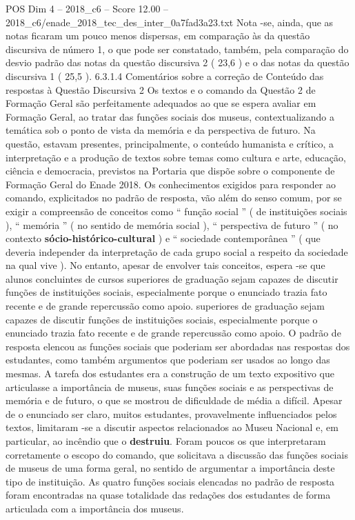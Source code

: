 \begin{textsample}{POS Dim 4 – 2018\_c6 – Score 12.00 – 2018\_c6/enade\_2018\_tec\_des\_inter\_0a7fad3a23.txt}
Nota -se, ainda, que as notas ficaram um pouco menos dispersas, em comparação às da questão discursiva de número 1, o que pode ser constatado, também, pela comparação do desvio padrão das notas da questão discursiva 2 ( 23,6 ) e o das notas da questão discursiva 1 ( 25,5 ). 6.3.1.4 Comentários sobre a correção de Conteúdo das respostas à Questão Discursiva 2 Os textos e o comando da Questão 2 de Formação Geral são perfeitamente adequados ao que se espera avaliar em Formação Geral, ao tratar das funções sociais dos museus, contextualizando a temática sob o ponto de vista da memória e da perspectiva de futuro.
Na questão, estavam presentes, principalmente, o conteúdo humanista e crítico, a interpretação e a produção de textos sobre temas como cultura e arte, educação, ciência e democracia, previstos na Portaria que dispõe sobre o componente de Formação Geral do Enade 2018.
Os conhecimentos exigidos para responder ao comando, explicitados no padrão de resposta, vão além do senso comum, por se exigir a compreensão de conceitos como “ função social ” ( de instituições sociais ), “ memória ” ( no sentido de memória social ), “ perspectiva de futuro ” ( no contexto \textbf{sócio-histórico-cultural} ) e “ sociedade contemporânea ” ( que deveria independer da interpretação de cada grupo social a respeito da sociedade na qual vive ).
No entanto, apesar de envolver tais conceitos, espera -se que alunos concluintes de cursos superiores de graduação sejam capazes de discutir funções de instituições sociais, especialmente porque o enunciado trazia fato recente e de grande repercussão como apoio. superiores de graduação sejam capazes de discutir funções de instituições sociais, especialmente porque o enunciado trazia fato recente e de grande repercussão como apoio.
O padrão de resposta elencou as funções sociais que poderiam ser abordadas nas respostas dos estudantes, como também argumentos que poderiam ser usados ao longo das mesmas.
A tarefa dos estudantes era a construção de um texto expositivo que articulasse a importância de museus, suas funções sociais e as perspectivas de memória e de futuro, o que se mostrou de dificuldade de média a difícil.
Apesar de o enunciado ser claro, muitos estudantes, provavelmente influenciados pelos textos, limitaram -se a discutir aspectos relacionados ao Museu Nacional e, em particular, ao incêndio que o \textbf{destruiu}.
Foram poucos os que interpretaram corretamente o escopo do comando, que solicitava a discussão das funções sociais de museus de uma forma geral, no sentido de argumentar a importância deste tipo de instituição.
As quatro funções sociais elencadas no padrão de resposta foram encontradas na quase totalidade das redações dos estudantes de forma articulada com a importância dos museus.

\end{textsample}

